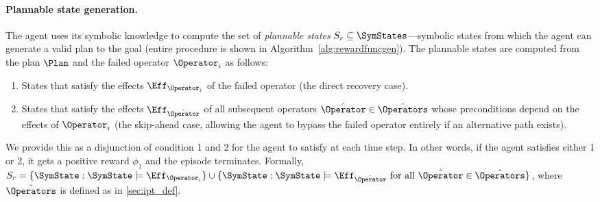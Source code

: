 \paragraph{Plannable state generation.} The agent uses its symbolic knowledge to compute the set of \emph{plannable states} $S_r \subseteq \SymStates$---symbolic states from which the agent can generate a valid plan to the goal (entire procedure is shown in Algorithm~\ref{alg:rewardfuncgen}). The plannable states are computed from the plan $\Plan$ and the failed operator $\Operator_i$ as follows:
\begin{enumerate}[leftmargin=*]
    \item States that satisfy the effects $\Eff_{\Operator_i}$ of the failed operator (the direct recovery case).
    \item States that satisfy the effects $\Eff_{\hat{\Operator}}$ of all subsequent operators $\hat{\Operator} \in \hat{\Operators}$ whose preconditions depend on the effects of $\Operator_i$ (the skip-ahead case, allowing the agent to bypass the failed operator entirely if an alternative path exists).
\end{enumerate}
 We provide this as a disjunction of condition 1 and 2 for the agent to satisfy at each time step. In other words, if the agent satisfies either 1 or 2, it gets a positive reward $\phi_1$ and the episode terminates. 
Formally, $S_r = \{ \SymState : \SymState \models \Eff_{\Operator_i} \} \cup \{ \SymState : \SymState \models \Eff_{\hat{\Operator}} \text{ for all } \hat{\Operator} \in \hat{\Operators} \}$, where $\hat{\Operators}$ is defined as in \cref{sec:ipt_def}. 

